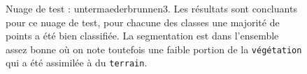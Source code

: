 \documentclass[a4paper, onecolumn, 11pt]{article}
\begin{document}
\begin{figure}[h]
    \caption{Nuage de test : untermaederbrunnen3. Les résultats sont concluants pour ce nuage de test, pour chacune des classes une majorité de points a été bien classifiée. La segmentation est dans l'ensemble assez bonne où on note toutefois une faible portion de la \texttt{végétation} qui a été assimilée à du \texttt{terrain}.}
    \label{fig:untermaederbrunnen3}
\end{figure}

\begin{figure}[h]
    \centering
    \qquad
    \qquad

\end{figure}
\end{document}
